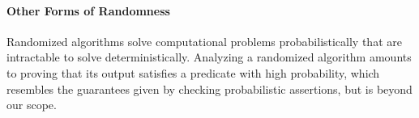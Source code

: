 







\paragraph{Other Forms of Randomness} %
Randomized algorithms solve computational problems
probabilistically that are intractable to solve deterministically.
Analyzing a randomized algorithm amounts to proving that its output satisfies
a predicate with high probability, which resembles the guarantees given by
checking probabilistic assertions, but is beyond our scope.



